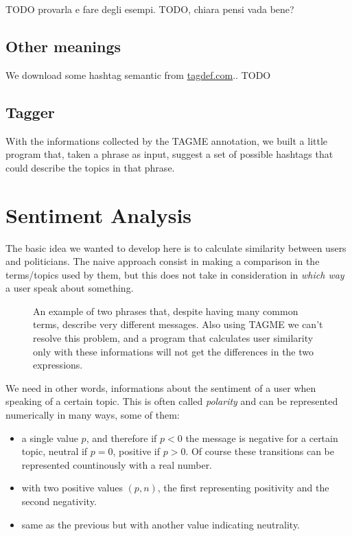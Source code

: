 \documentclass[a4paper,11pt,oneside]{article}
\begin{document}
TODO provarla e fare degli esempi. TODO, chiara pensi vada bene?

\subsection{Other meanings}
We download some hashtag semantic from \href{http://tagdef.com/}{tagdef.com}.. TODO

\subsection{Tagger}
\label{sec:tagger}
With the informations collected by the TAGME annotation, we built a little program that, taken a phrase as input, suggest a set of possible hashtags that could describe the topics in that phrase.

\section{Sentiment Analysis}
The basic idea we wanted to develop here is to calculate similarity between users and politicians. The naive approach consist in making a comparison in the terms/topics used by them, but this does not take in consideration in \textit{which way} a user speak about something.

\begin{figure}[h]
\caption{An example of two phrases that, despite having many common terms, describe very different messages.
Also using TAGME we can't resolve this problem, and a program that calculates user similarity only with these informations will not get the differences in the two expressions.}
\end{figure}

We need in other words, informations about the sentiment of a user when speaking of a certain topic. This is often called \textit{polarity} and can be represented numerically in many ways, some of them: 
\begin{itemize}
\item a single value $p$, and therefore if $p < 0$ the message is negative for a certain topic, neutral if $p = 0$, positive if $p > 0$. Of course these transitions can be represented countinously with a real number.
\item with two positive values $(p,n)$, the first representing positivity and the second negativity.
\item same as the previous but with another value indicating neutrality.
\end{itemize}
\end{document}
